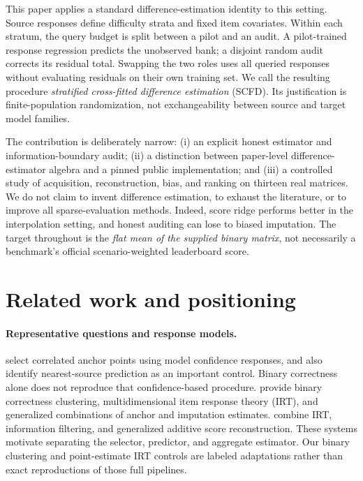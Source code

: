 \documentclass{article}
\begin{document}
This paper applies a standard difference-estimation identity to this setting. Source responses define difficulty strata and fixed item covariates. Within each stratum, the query budget is split between a pilot and an audit. A pilot-trained response regression predicts the unobserved bank; a disjoint random audit corrects its residual total. Swapping the two roles uses all queried responses without evaluating residuals on their own training set. We call the resulting procedure \emph{stratified cross-fitted difference estimation} (SCFD). Its justification is finite-population randomization, not exchangeability between source and target model families.

The contribution is deliberately narrow: (i) an explicit honest estimator and information-boundary audit; (ii) a distinction between paper-level difference-estimator algebra and a pinned public implementation; and (iii) a controlled study of acquisition, reconstruction, bias, and ranking on thirteen real matrices. We do not claim to invent difference estimation, to exhaust the literature, or to improve all sparse-evaluation methods. Indeed, score ridge performs better in the interpolation setting, and honest auditing can lose to biased imputation. The target throughout is the \emph{flat mean of the supplied binary matrix}, not necessarily a benchmark's official scenario-weighted leaderboard score.

\section{Related work and positioning}
\paragraph{Representative questions and response models.}
\citet{vivek2023anchorpoints} select correlated anchor points using model confidence responses, and also identify nearest-source prediction as an important control. Binary correctness alone does not reproduce that confidence-based procedure. \citet{polo2024tinybenchmarks} provide binary correctness clustering, multidimensional item response theory (IRT), and generalized combinations of anchor and imputation estimates. \citet{kipnis2025metabench} combine IRT, information filtering, and generalized additive score reconstruction. These systems motivate separating the selector, predictor, and aggregate estimator. Our binary clustering and point-estimate IRT controls are labeled adaptations rather than exact reproductions of those full pipelines.
\end{document}
